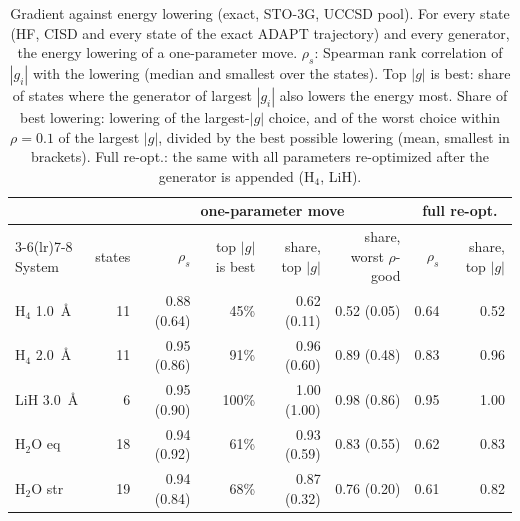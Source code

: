 \begin{table}[!htb]
\centering\small
\caption{Gradient against energy lowering (exact, STO-3G, UCCSD pool). For every state (HF, CISD and every state of the exact ADAPT trajectory) and every generator, the energy lowering of a one-parameter move. $\rho_s$: Spearman rank correlation of $|g_i|$ with the lowering (median and smallest over the states). Top $|g|$ is best: share of states where the generator of largest $|g_i|$ also lowers the energy most. Share of best lowering: lowering of the largest-$|g|$ choice, and of the worst choice within $\rho=0.1$ of the largest $|g|$, divided by the best possible lowering (mean, smallest in brackets). Full re-opt.: the same with all parameters re-optimized after the generator is appended (H$_4$, LiH).}
\label{tab:S_grad_energy}
\footnotesize\setlength{\tabcolsep}{3pt}
\begin{tabular}{lrrrrrrr}
\toprule
 & & \multicolumn{4}{c}{one-parameter move} & \multicolumn{2}{c}{full re-opt.} \\
\cmidrule(lr){3-6}\cmidrule(lr){7-8}
System & states & $\rho_s$ & top $|g|$ is best & share, top $|g|$ & share, worst $\rho$-good & $\rho_s$ & share, top $|g|$ \\
\midrule
H$_4$ 1.0~\AA & 11 & 0.88 (0.64) & 45\% & 0.62 (0.11) & 0.52 (0.05) & 0.64 & 0.52 \\
H$_4$ 2.0~\AA & 11 & 0.95 (0.86) & 91\% & 0.96 (0.60) & 0.89 (0.48) & 0.83 & 0.96 \\
LiH 3.0~\AA & 6 & 0.95 (0.90) & 100\% & 1.00 (1.00) & 0.98 (0.86) & 0.95 & 1.00 \\
H$_2$O eq & 18 & 0.94 (0.92) & 61\% & 0.93 (0.59) & 0.83 (0.55) & 0.62 & 0.83 \\
H$_2$O str & 19 & 0.94 (0.84) & 68\% & 0.87 (0.32) & 0.76 (0.20) & 0.61 & 0.82 \\
\bottomrule
\end{tabular}
\end{table}
